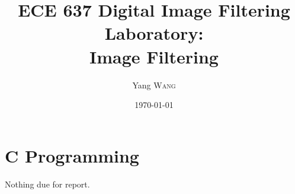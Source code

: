 \documentclass{article}
\title{ECE 637 Digital Image Filtering Laboratory: \\ Image Filtering} %
\author{Yang \textsc{Wang}} %
\date{\today} %
\begin{document}
\maketitle %



\section{C Programming}

Nothing due for report.


 
\end{document}
